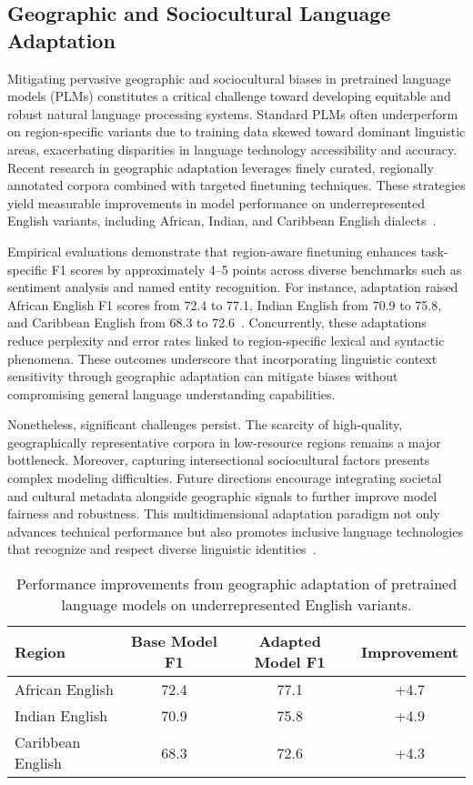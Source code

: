 \documentclass[sigconf]{acmart}
\begin{document}
\subsection{Geographic and Sociocultural Language Adaptation}

Mitigating pervasive geographic and sociocultural biases in pretrained language models (PLMs) constitutes a critical challenge toward developing equitable and robust natural language processing systems. Standard PLMs often underperform on region-specific variants due to training data skewed toward dominant linguistic areas, exacerbating disparities in language technology accessibility and accuracy. Recent research in geographic adaptation leverages finely curated, regionally annotated corpora combined with targeted finetuning techniques. These strategies yield measurable improvements in model performance on underrepresented English variants, including African, Indian, and Caribbean English dialects~\cite{ref30}.

Empirical evaluations demonstrate that region-aware finetuning enhances task-specific F1 scores by approximately 4–5 points across diverse benchmarks such as sentiment analysis and named entity recognition. For instance, adaptation raised African English F1 scores from 72.4 to 77.1, Indian English from 70.9 to 75.8, and Caribbean English from 68.3 to 72.6~\cite{ref30}. Concurrently, these adaptations reduce perplexity and error rates linked to region-specific lexical and syntactic phenomena. These outcomes underscore that incorporating linguistic context sensitivity through geographic adaptation can mitigate biases without compromising general language understanding capabilities.

Nonetheless, significant challenges persist. The scarcity of high-quality, geographically representative corpora in low-resource regions remains a major bottleneck. Moreover, capturing intersectional sociocultural factors presents complex modeling difficulties. Future directions encourage integrating societal and cultural metadata alongside geographic signals to further improve model fairness and robustness. This multidimensional adaptation paradigm not only advances technical performance but also promotes inclusive language technologies that recognize and respect diverse linguistic identities~\cite{ref30}.

\begin{table*}[htbp]
\centering
\caption{Performance improvements from geographic adaptation of pretrained language models on underrepresented English variants.}
\label{tab:geo_adaptation_results}
\begin{adjustbox}{max width=\textwidth}
\begin{tabular}{@{}lccc@{}}
\toprule
Region & Base Model F1 & Adapted Model F1 & Improvement \\ \midrule
African English & 72.4 & 77.1 & +4.7 \\
Indian English & 70.9 & 75.8 & +4.9 \\
Caribbean English & 68.3 & 72.6 & +4.3 \\ \bottomrule
\end{tabular}
\end{adjustbox}
\end{table*}
\end{document}
